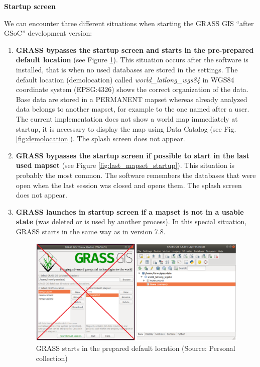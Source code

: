 \documentclass[a4paper,10pt,twoside]{article}
\begin{document}
\newpage
\vspace*{-1cm}
\bigskip
\noindent \textbf {Startup screen}

\noindent We can encounter three different situations when starting the GRASS GIS ``after GSoC'' development version:

\begin{enumerate}

\item \textbf{GRASS bypasses the startup screen and starts in the pre-prepared default location} (see Figure \ref{fig:demolocation_startup}). This situation occurs after the software is installed, that is when no used databases are stored in the settings. The default location (demolocation) called \textit{world\_latlong\_wgs84} in WGS84 coordinate system (EPSG:4326) shows the correct organization of the data. Base data are stored in a PERMANENT mapset whereas already analyzed data belongs to another mapset, for example to the one named after a user. The current implementation does not show a world map immediately at startup, it is necessary to display the map using Data Catalog (see Fig. \ref{fig:demolocation}). The splash screen does not appear.
\item\textbf{ GRASS bypasses the startup screen if possible to start in the last used mapset} (see Figure \ref{fig:last_mapset_startup}). This situation is probably the most common. The software remembers the databases that were open when the last session was closed and opens them.  The splash screen does not appear.
\item \textbf{GRASS launches in startup screen if a mapset is not in a usable state} (was deleted or is used by another process). In this special situation, GRASS starts in the same way as in version 7.8.

\vspace{0.3cm}
\begin{figure}[hbt!] 
\begin{center}
\includegraphics[width=17cm]{../pictures/demolocation_startup.png} 
\caption[GRASS starts in the prepared default location]{GRASS starts in the prepared default location (Source: Personal collection)}
\label{fig:demolocation_startup}
\end{center}
\end{figure}


\end{enumerate}
\end{document}
